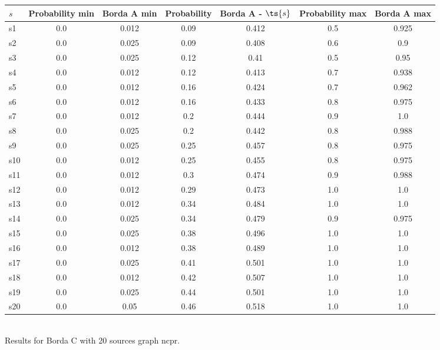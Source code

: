 \documentclass{article}
\begin{document}
\noindent\begin{tabular}{|l|c|c|c|c|c|c|}
\hline
$s$& Probability min & Borda A min & Probability & Borda A - $\ts{s}$ & Probability max & Borda A max\\
\hline
s1 &0.0 & 0.012 & 0.09 & 0.412 & 0.5 & 0.925\\
\hline
s2 &0.0 & 0.025 & 0.09 & 0.408 & 0.6 & 0.9\\
\hline
s3 &0.0 & 0.025 & 0.12 & 0.41 & 0.5 & 0.95\\
\hline
s4 &0.0 & 0.012 & 0.12 & 0.413 & 0.7 & 0.938\\
\hline
s5 &0.0 & 0.012 & 0.16 & 0.424 & 0.7 & 0.962\\
\hline
s6 &0.0 & 0.012 & 0.16 & 0.433 & 0.8 & 0.975\\
\hline
s7 &0.0 & 0.012 & 0.2 & 0.444 & 0.9 & 1.0\\
\hline
s8 &0.0 & 0.025 & 0.2 & 0.442 & 0.8 & 0.988\\
\hline
s9 &0.0 & 0.025 & 0.25 & 0.457 & 0.8 & 0.975\\
\hline
s10 &0.0 & 0.012 & 0.25 & 0.455 & 0.8 & 0.975\\
\hline
s11 &0.0 & 0.012 & 0.3 & 0.474 & 0.9 & 0.988\\
\hline
s12 &0.0 & 0.012 & 0.29 & 0.473 & 1.0 & 1.0\\
\hline
s13 &0.0 & 0.012 & 0.34 & 0.484 & 1.0 & 1.0\\
\hline
s14 &0.0 & 0.025 & 0.34 & 0.479 & 0.9 & 0.975\\
\hline
s15 &0.0 & 0.025 & 0.38 & 0.496 & 1.0 & 1.0\\
\hline
s16 &0.0 & 0.012 & 0.38 & 0.489 & 1.0 & 1.0\\
\hline
s17 &0.0 & 0.025 & 0.41 & 0.501 & 1.0 & 1.0\\
\hline
s18 &0.0 & 0.012 & 0.42 & 0.507 & 1.0 & 1.0\\
\hline
s19 &0.0 & 0.025 & 0.44 & 0.501 & 1.0 & 1.0\\
\hline
s20 &0.0 & 0.05 & 0.46 & 0.518 & 1.0 & 1.0\\
\hline
\end{tabular}\\

\noindent Results for Borda C with 20 sources graph ncpr.
\end{document}
